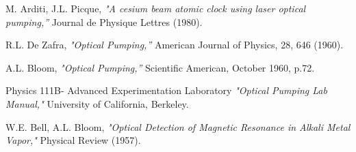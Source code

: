 \documentclass[%
 aip,
rsi,%
 amsmath,amssymb,
 reprint,%
author-numerical,%
]{revtex4-1}
\begin{document}
   
\nocite{*}

 \begin{thebibliography}{1}
 
 M. Arditi, J.L. Picque, {\em "A cesium beam atomic clock using laser optical pumping,”} Journal de Physique Lettres (1980). \newline

 R.L. De Zafra, {\em "Optical Pumping,”} American Journal of Physics, 28, 646 (1960). \newline

 A.L. Bloom, {\em "Optical Pumping,”} Scientific American, October 1960, p.72. \newline


 Physics 111B- Advanced Experimentation Laboratory  {\em "Optical Pumping Lab Manual," } University of California, Berkeley.  \newline

 W.E. Bell, A.L. Bloom,  {\em "Optical Detection of Magnetic Resonance in Alkali Metal Vapor," } Physical Review (1957). \newline

\end{thebibliography}
\end{document}
